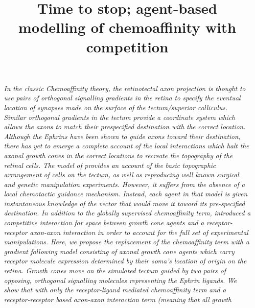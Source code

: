 \documentclass[11pt, a4paper]{article}
\title {
Time to stop; agent-based modelling of chemoaffinity with competition
}
\date{} %
\author{\Authors}
\begin{document}
\setlength{\droptitle}{-1.8cm} %
\maketitle

\vspace{-1.8cm} %

\emph{In the classic Chemoaffinity theory, the retinotectal axon projection is
thought to use pairs of orthogonal signalling gradients in the retina to
specify the eventual location of synapses made on the surface of the
tectum/superior colliculus. Similar orthogonal gradients in the tectum provide
a coordinate system which allows the axons to match their prespecified
destination with the correct location. Although the Ephrins have been shown to
guide axons toward their destination, there has yet to emerge a complete
account of the local interactions which halt the axonal growth cones in the
correct locations to recreate the topography of the retinal cells. The model
of \citet{simpson_simple_2011} provides an account of the basic topographic
arrangement of cells on the tectum, as well as reproducing well known surgical
and genetic manipulation experiments. However, it suffers from the absence of
a local chemotactic guidance mechanism. Instead, each agent in that model is
given instantaneous knowledge of the vector that would move it toward its
pre-specified destination. In addition to the globally supervised
chemoaffinity term, \citet{simpson_simple_2011} introduced a competitive
interaction for space between growth cone agents and a receptor-receptor
axon-axon interaction in order to account for the full set of experimental
manipulations. Here, we propose the replacement of the chemoaffinity term with
a gradient following model consisting of axonal growth cone agents which carry
receptor molecule expression determined by their soma's location of origin on
the retina. Growth cones move on the simulated tectum guided by two pairs of
opposing, orthogonal signalling molecules representing the Ephrin ligands. We
show that with only the receptor-ligand mediated chemoaffinity term and a
receptor-receptor based axon-axon interaction term (meaning that all growth
}
\end{document}
